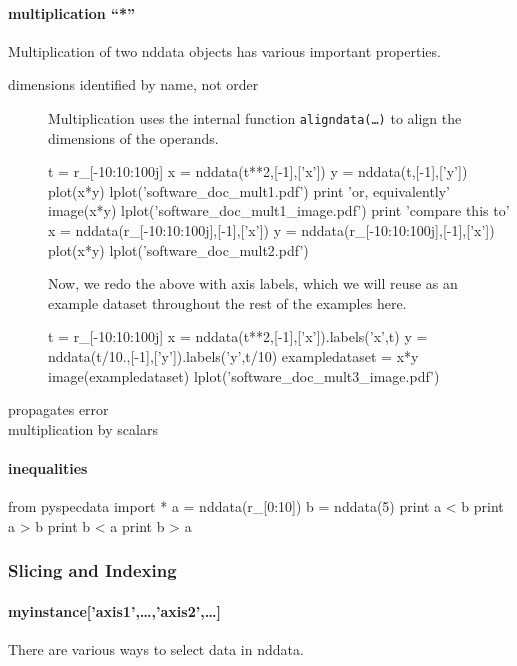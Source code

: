 \paragraph{multiplication ``*''}
Multiplication of two nddata objects has various important properties.
\begin{description}
\item[dimensions identified by name, not order]
Multiplication uses the internal function \texttt{aligndata(\ldots)} \label{codelabel:aligndata}
    to align the dimensions of the operands.

\begin{python}
t = r_[-10:10:100j]
x = nddata(t**2,[-1],['x'])
y = nddata(t,[-1],['y'])
plot(x*y)
lplot('software_doc_mult1.pdf')
print 'or, equivalently'
image(x*y)
lplot('software_doc_mult1_image.pdf')
print 'compare this to'
x = nddata(r_[-10:10:100j],[-1],['x'])
y = nddata(r_[-10:10:100j],[-1],['x'])
plot(x*y)
lplot('software_doc_mult2.pdf')
\end{python}

Now, we redo the above with axis labels,
    which we will reuse as an example dataset
    throughout the rest of the examples here.

\begin{python}
t = r_[-10:10:100j]
x = nddata(t**2,[-1],['x']).labels('x',t)
y = nddata(t/10.,[-1],['y']).labels('y',t/10)
exampledataset = x*y
image(exampledataset)
lplot('software_doc_mult3_image.pdf')
\end{python}
\item[propagates error]
\nts{\ldots}
\item[multiplication by scalars]
\nts{\ldots}
\end{description}
\paragraph{inequalities}

\begin{python}
from pyspecdata import *
a = nddata(r_[0:10])
b = nddata(5)
print a < b
print a > b
print b < a
print b > a
\end{python}
\subsubsection{Slicing and Indexing}
\paragraph{myinstance['axis1',\ldots,'axis2',\ldots]}
There are various ways to select data in nddata.

